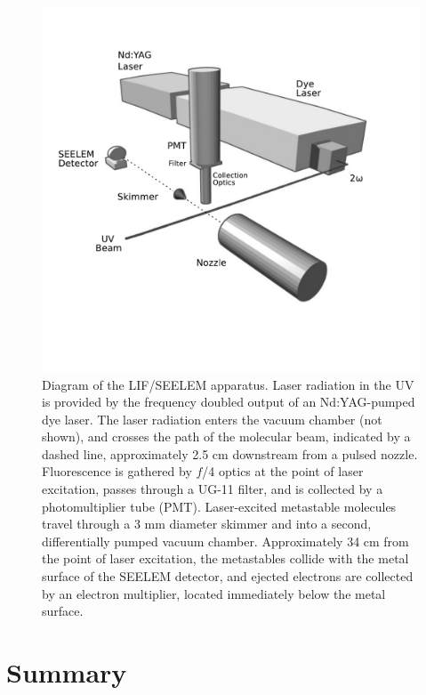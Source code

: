 \begin{figure}
  \caption{Diagram of the LIF/SEELEM apparatus.  Laser radiation in
    the UV is provided by the frequency doubled output of an
    Nd:YAG-pumped dye laser.  The laser radiation enters the vacuum
    chamber (not shown), and crosses the path of the molecular beam,
    indicated by a dashed line, approximately 2.5 cm downstream from a
    pulsed nozzle.  Fluorescence is gathered by $f$/4 optics at the
    point of laser excitation, passes through a UG-11 filter, and is
    collected by a photomultiplier tube (PMT).  Laser-excited
    metastable molecules travel through a 3 mm diameter skimmer and
    into a second, differentially pumped vacuum chamber.
    Approximately 34 cm from the point of laser excitation, the
    metastables collide with the metal surface of the SEELEM detector,
    and ejected electrons are collected by an electron multiplier,
    located immediately below the metal surface.}
  \label{fig:apparatus}
  \centering
  \includegraphics[width=7in,trim=1cm 0 0 0]{apparatus-bw}
\end{figure}




\section{Summary}

